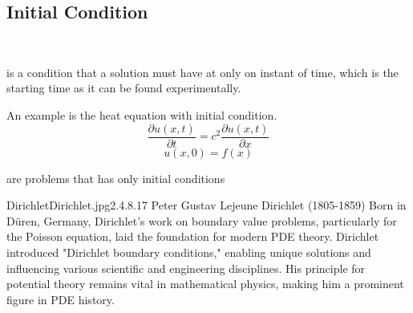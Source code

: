 \documentclass[]{article}
\begin{document}
\subsection{Initial Condition}
\
\begin{definition}
    is a condition that a solution must have at only on instant of time, which is the starting time as it can be found experimentally.
\end{definition}
An example is the heat equation with initial condition.
\[
    \frac{\partial u(x,t)}{\partial t}  = c^2 \frac{\partial u(x,t)}{\partial x}
\]
\[
    u(x,0) = f(x)
\]
\begin{definition}
    are problems that has only initial conditions
\end{definition}
\begin{enrichment}{Dirichlet}{Dirichlet.jpg}{2.4}{.8}{.17}
    Peter Gustav Lejeune Dirichlet (1805-1859)  Born in Düren, Germany, Dirichlet's work on boundary value problems, particularly for the Poisson equation, laid the foundation for modern PDE theory. Dirichlet introduced "Dirichlet boundary conditions," enabling unique solutions and influencing various scientific and engineering disciplines. His principle for potential theory remains vital in mathematical physics, making him a prominent figure in PDE history.
\end{enrichment}
\end{document}
